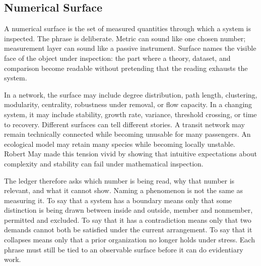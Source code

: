 \documentclass[11pt,a4paper,openany]{book}
\begin{document}
\subsection{Numerical Surface}
A numerical surface is the set of measured quantities through which a system is inspected. The phrase is deliberate. Metric can sound like one chosen number; measurement layer can sound like a passive instrument. Surface names the visible face of the object under inspection: the part where a theory, dataset, and comparison become readable without pretending that the reading exhausts the system. \cite{newman_networks,barabasi_scale_free}\par
In a network, the surface may include degree distribution, path length, clustering, modularity, centrality, robustness under removal, or flow capacity. In a changing system, it may include stability, growth rate, variance, threshold crossing, or time to recovery. Different surfaces can tell different stories. A transit network may remain technically connected while becoming unusable for many passengers. An ecological model may retain many species while becoming locally unstable. Robert May made this tension vivid by showing that intuitive expectations about complexity and stability can fail under mathematical inspection.\par
The ledger therefore asks which number is being read, why that number is relevant, and what it cannot show. Naming a phenomenon is not the same as measuring it. To say that a system has a boundary means only that some distinction is being drawn between inside and outside, member and nonmember, permitted and excluded. To say that it has a contradiction means only that two demands cannot both be satisfied under the current arrangement. To say that it collapses means only that a prior organization no longer holds under stress. Each phrase must still be tied to an observable surface before it can do evidentiary work.\par
\end{document}
